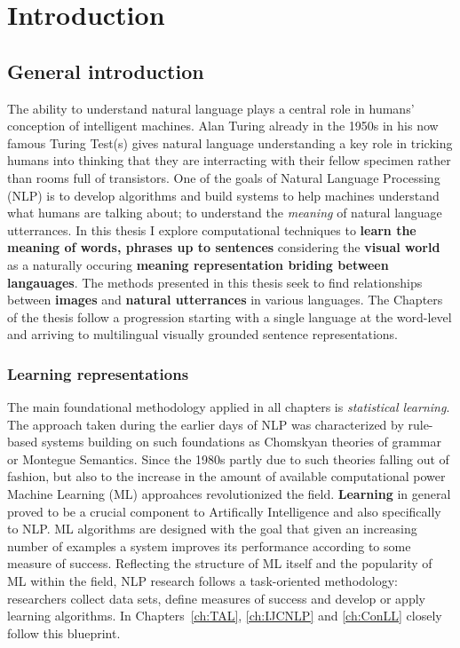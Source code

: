
\chapter{Introduction}

\section{General introduction}

The ability to understand natural language plays a central role in humans' conception of intelligent machines.
Alan Turing already in the 1950s in his now famous Turing Test(s) gives natural language understanding a 
key role in tricking humans into thinking that they are interracting with their fellow specimen rather 
than rooms full of transistors. One of the goals of Natural Language Processing (NLP) is to develop algorithms
and build systems to help machines understand what humans are talking about; to 
understand the \emph{meaning} of natural language utterrances. 
In this thesis I explore computational techniques to \textbf{learn the meaning of words, phrases up to sentences}
considering the \textbf{visual world} as a naturally occuring 
\textbf{meaning representation briding between langauages}.
The methods presented in this thesis seek to find relationships between \textbf{images} and 
\textbf{natural utterrances} in various languages. The  Chapters of the thesis follow a progression 
starting with a single language at the word-level and arriving to multilingual visually grounded sentence
representations.

\subsection{Learning representations}
The main foundational methodology applied in all chapters is \emph{statistical learning}. 
The approach taken during the earlier days of NLP was characterized by rule-based systems building on such 
foundations as Chomskyan theories of grammar or Montegue Semantics. 
Since the 1980s partly due to such theories falling out of fashion, but also to the increase in the amount 
of available computational power Machine Learning (ML) approahces revolutionized
the field.  \textbf{Learning} in general proved to be a crucial component to Artifically Intelligence and also
specifically to NLP. ML algorithms are designed with the goal that given an increasing 
number of examples a system improves its performance according to some measure of success.
Reflecting the structure of ML itself and the popularity of ML within the field, NLP research follows
a task-oriented methodology: researchers collect data sets, define measures of success and develop or
apply learning algorithms. In Chapters~\ref{ch:TAL}, \ref{ch:IJCNLP} and \ref{ch:ConLL} closely follow this blueprint.

